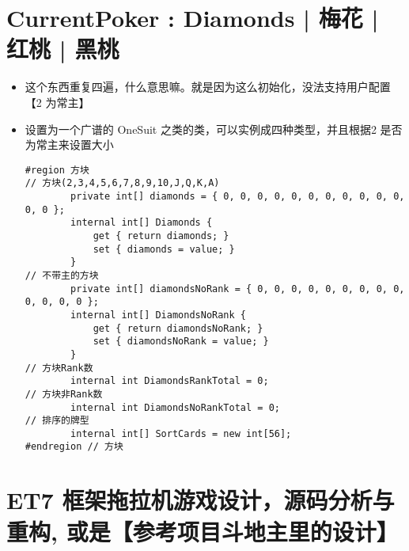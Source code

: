 \documentclass[9pt, b5paper]{article}
\begin{document}
\section{CurrentPoker : Diamonds | 梅花 | 红桃 | 黑桃}
\label{sec-2}
\begin{itemize}
\item 这个东西重复四遍，什么意思嘛。就是因为这么初始化，没法支持用户配置【2 为常主】
\item 设置为一个广谱的 OneSuit 之类的类，可以实例成四种类型，并且根据2 是否为常主来设置大小
\begin{verbatim}
#region 方块
// 方块(2,3,4,5,6,7,8,9,10,J,Q,K,A)
        private int[] diamonds = { 0, 0, 0, 0, 0, 0, 0, 0, 0, 0, 0, 0, 0 };
        internal int[] Diamonds {
            get { return diamonds; }
            set { diamonds = value; }
        }
// 不带主的方块
        private int[] diamondsNoRank = { 0, 0, 0, 0, 0, 0, 0, 0, 0, 0, 0, 0, 0 };
        internal int[] DiamondsNoRank {
            get { return diamondsNoRank; }
            set { diamondsNoRank = value; }
        }
// 方块Rank数
        internal int DiamondsRankTotal = 0;
// 方块非Rank数
        internal int DiamondsNoRankTotal = 0;
// 排序的牌型
        internal int[] SortCards = new int[56];
#endregion // 方块
\end{verbatim}
\end{itemize}

\section{ET7 框架拖拉机游戏设计，源码分析与重构, 或是【参考项目斗地主里的设计】}
\label{sec-3}
\end{document}
